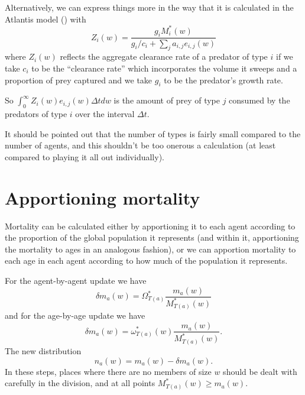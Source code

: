 Alternatively, we can express things more in the way that it is
calculated in the Atlantis model (\cite{Fulton2011pcomm}) with
\[ Z_i (w) = \frac{g_i M^{\ast}_i (w)}{g_i / c_i + \sum_j a_{i,j} e_{i,j} (w)}
\]
where $Z_i (w)$ reflects the aggregate clearance rate of a predator of type
$i$ if we take $c_i$ to be the ``clearance rate'' which incorporates the
volume it sweeps and a proportion of prey captured and we take $g_i$ to be the
predator's growth rate.

So $\int_0^{\infty} Z_i (w) e_{i,j} (w) \Delta t d w$ is the amount of prey of
type $j$ consumed by the predators of type $i$ over the interval $\Delta t$.



It should be pointed out that the number of types is fairly small compared to
the number of agents, and this shouldn't be too onerous a calculation (at
least compared to playing it all out individually).

\section{Apportioning mortality}

Mortality can be calculated either by apportioning it to each agent according
to the proportion of the global population it represents (and within it,
apportioning the mortality to ages in an analogous fashion), or we can
apportion mortality to each age in each agent according to how much of the
population it represents.

For the agent-by-agent update we have
\[ \delta m_a (w) = \Omega^{\ast}_{T (a)}  \frac{m_a (w)}{M^{\ast}_{T (a)}
   (w)} \]
and for the age-by-age update we have
\[ \delta m_a (w) = \omega^{\ast}_{T (a)} (w)  \frac{m_a (w)}{M^{\ast}_{T (a)}
   (w)} . \]
The new distribution
\[ n_a (w) = m_a (w) - \delta m_a (w) . \]
In these steps, places where there are no members of size $w$ should be dealt
with carefully in the division, and at all points $M^{\ast}_{T (a)} (w)
\geqslant m_a (w)$.







